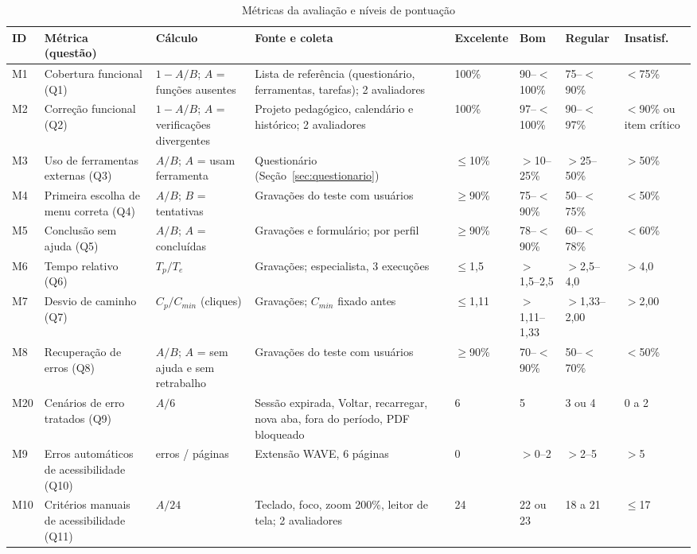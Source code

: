 \begin{table}[!t]
	\caption{Métricas da avaliação e níveis de pontuação}
	\label{tab:metricas}
	\centering
	\scriptsize
	\setlength{\tabcolsep}{3pt}
	\begin{tabularx}{\textwidth}{L{0.55cm} L{2.6cm} L{2.7cm} Y C{1.15cm} C{1.35cm} C{1.35cm} C{1.6cm}}
		\toprule
		\textbf{ID} & \textbf{Métrica (questão)} & \textbf{Cálculo} & \textbf{Fonte e coleta} & \textbf{Excelente} & \textbf{Bom} & \textbf{Regular} & \textbf{Insatisf.} \\
		\midrule
		M1 & Cobertura funcional (Q1) & $1-A/B$; $A$ = funções ausentes & Lista de referência (questionário, ferramentas, tarefas); 2 avaliadores & 100\% & 90--$<$100\% & 75--$<$90\% & $<$75\% \\
		M2 & Correção funcional (Q2) & $1-A/B$; $A$ = verificações divergentes & Projeto pedagógico, calendário e histórico; 2 avaliadores & 100\% & 97--$<$100\% & 90--$<$97\% & $<$90\% ou item crítico \\
		M3 & Uso de ferramentas externas (Q3) & $A/B$; $A$ = usam ferramenta & Questionário (Seção~\ref{sec:questionario}) & $\leq$10\% & $>$10--25\% & $>$25--50\% & $>$50\% \\
		\midrule
		M4 & Primeira escolha de menu correta (Q4) & $A/B$; $B$ = tentativas & Gravações do teste com usuários & $\geq$90\% & 75--$<$90\% & 50--$<$75\% & $<$50\% \\
		M5 & Conclusão sem ajuda (Q5) & $A/B$; $A$ = concluídas & Gravações e formulário; por perfil & $\geq$90\% & 78--$<$90\% & 60--$<$78\% & $<$60\% \\
		M6 & Tempo relativo (Q6) & $T_p/T_e$ & Gravações; especialista, 3 execuções & $\leq$1,5 & $>$1,5--2,5 & $>$2,5--4,0 & $>$4,0 \\
		M7 & Desvio de caminho (Q7) & $C_p/C_{min}$ (cliques) & Gravações; $C_{min}$ fixado antes & $\leq$1,11 & $>$1,11--1,33 & $>$1,33--2,00 & $>$2,00 \\
		M8 & Recuperação de erros (Q8) & $A/B$; $A$ = sem ajuda e sem retrabalho & Gravações do teste com usuários & $\geq$90\% & 70--$<$90\% & 50--$<$70\% & $<$50\% \\
		M20 & Cenários de erro tratados (Q9) & $A/6$ & Sessão expirada, Voltar, recarregar, nova aba, fora do período, PDF bloqueado & 6 & 5 & 3 ou 4 & 0 a 2 \\
		M9 & Erros automáticos de acessibilidade (Q10) & erros / páginas & Extensão WAVE, 6 páginas & 0 & $>$0--2 & $>$2--5 & $>$5 \\
		M10 & Critérios manuais de acessibilidade (Q11) & $A/24$ & Teclado, foco, zoom 200\%, leitor de tela; 2 avaliadores & 24 & 22 ou 23 & 18 a 21 & $\leq$17 \\

\end{tabularx}
\end{table}
